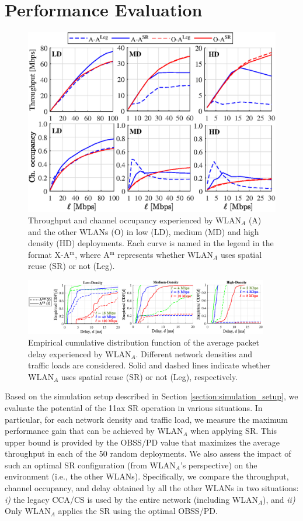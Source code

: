 \documentclass{article}
\begin{document}
	\section{Performance Evaluation}
	\label{section:perfromance_evaluation}
	
	\begin{figure}[ht!]
		\centering
		\includegraphics[width=.5\columnwidth]{throughput_occupancy}
		\caption{Throughput and channel occupancy experienced by WLAN$_A$ (A) and the other WLANs (O) in low (LD), medium (MD) and high density (HD) deployments. Each curve is named in the legend in the format X-A$^{\text{m}}$, where A$^{\text{m}}$ represents whether WLAN$_A$ uses spatial reuse (SR) or not (Leg).}
		\label{fig:throughput_occupancy}
	\end{figure}
	
	\begin{figure}[ht!]
		\centering
		\includegraphics[width=0.95\textwidth]{cdf_delay}
		\caption{Empirical cumulative distribution function of the average packet delay experienced by WLAN$_A$. Different network densities and traffic loads are considered. Solid and dashed lines indicate whether WLAN$_A$ uses spatial reuse (SR) or not (Leg), respectively.}
		\label{fig:cdf_delay}
	\end{figure}
	
	Based on the simulation setup described in Section \ref{section:simulation_setup}, we evaluate the potential of the 11ax SR operation in various situations. In particular, for each network density and traffic load, we measure the maximum performance gain that can be achieved by WLAN$_A$ when applying SR. This upper bound is provided by the OBSS/PD value that maximizes the average throughput in each of the 50 random deployments. We also assess the impact of such an optimal SR configuration (from WLAN$_A$'s perspective) on the environment (i.e., the other WLANs). Specifically, we compare the throughput, channel occupancy, and delay obtained by all the other WLANs in two situations: \emph{i)} the legacy CCA/CS is used by the entire network (including WLAN$_A$), and \emph{ii)} Only WLAN$_A$ applies the SR using the optimal OBSS/PD.
	
\end{document}
